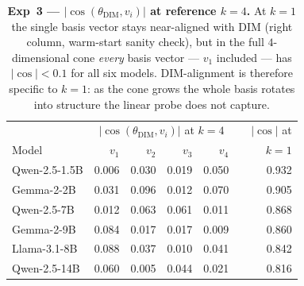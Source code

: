%
\begin{table}[!ht]
\centering
\caption{%
\textbf{Exp~3 — $|\cos(\theta_{\text{DIM}}, v_i)|$ at reference $k=4$.}
At $k{=}1$ the single basis vector stays near-aligned with DIM (right column,
warm-start sanity check), but in the full $4$-dimensional cone \emph{every} basis
vector --- $v_1$ included --- has $|\cos|<0.1$ for all six models. DIM-alignment
is therefore specific to $k{=}1$: as the cone grows the whole basis rotates into
structure the linear probe does not capture.}
\label{tab:orthogonality}
\small
\setlength{\tabcolsep}{4pt}
\begin{tabular}{l rrrr c r}
\toprule
& \multicolumn{4}{c}{$|\cos(\theta_{\text{DIM}}, v_i)|$ at $k=4$} & & $|\cos|$ at \\
Model & $v_1$ & $v_2$ & $v_3$ & $v_4$ & & $k=1$ \\
\midrule
Qwen-2.5-1.5B & 0.006 & 0.030 & 0.019 & 0.050 & & 0.932 \\
Gemma-2-2B    & 0.031 & 0.096 & 0.012 & 0.070 & & 0.905 \\
Qwen-2.5-7B   & 0.012 & 0.063 & 0.061 & 0.011 & & 0.868 \\
Gemma-2-9B    & 0.084 & 0.017 & 0.017 & 0.009 & & 0.860 \\
Llama-3.1-8B  & 0.088 & 0.037 & 0.010 & 0.041 & & 0.842 \\
Qwen-2.5-14B  & 0.060 & 0.005 & 0.044 & 0.021 & & 0.816 \\
\bottomrule
\end{tabular}
\end{table}

